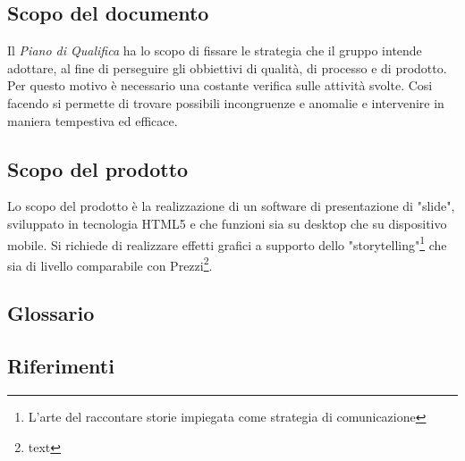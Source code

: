 \subsection{Scopo del documento}
Il \textit{Piano di Qualifica} ha lo scopo di fissare le strategia che il gruppo intende adottare, al fine di perseguire gli obbiettivi di qualità, di processo e di prodotto. Per questo motivo è necessario una costante verifica sulle attività svolte. Cosi facendo si permette di trovare possibili incongruenze e anomalie e intervenire in maniera tempestiva ed efficace.
\subsection{Scopo del prodotto}
Lo scopo del prodotto è la realizzazione di un software di presentazione di "slide", sviluppato in tecnologia HTML5 e che funzioni sia su desktop che su dispositivo mobile. Si richiede di realizzare effetti grafici a supporto dello "storytelling"\footnote{L'arte del raccontare storie impiegata come strategia di comunicazione} che sia di livello comparabile con Prezzi\footnote{text}.
\subsection{Glossario}

\subsection{Riferimenti}